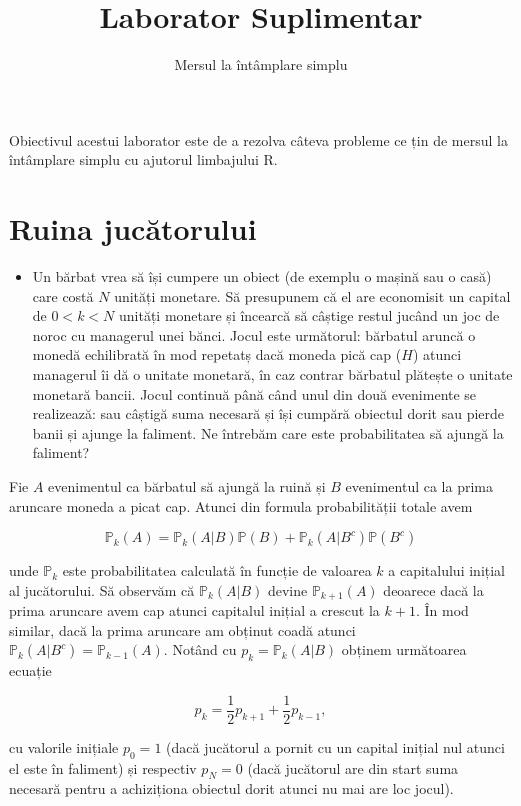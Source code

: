 \documentclass[]{article}
\title{Laborator Suplimentar}
\subtitle{Mersul la întâmplare simplu}
\author{}
\date{}
\newenvironment{frshaded*}{%
  \def\FrameCommand{\fboxrule=\FrameRule\fboxsep=\FrameSep \fcolorbox{framecolor}{shadecolor1}}%
  \MakeFramed {\advance\hsize-\width \FrameRestore}}%
{\endMakeFramed}
\newenvironment{rmdblock}[1]
  {\begin{frshaded*}
  \begin{itemize}
  \renewcommand{\labelitemi}{
    \raisebox{-.7\height}[0pt][0pt]{
      {\setkeys{Gin}{width=2em,keepaspectratio}\texttt{[image: images/icons/\#1]}}
    }
  }
  \item
  }
  {
  \end{itemize}
  \end{frshaded*}
  }
\newenvironment{rmdexercise}
  {\begin{rmdblock}{exercise}}
  {\end{rmdblock}}
\begin{document}
\maketitle

\thispagestyle{fancy}

Obiectivul acestui laborator este de a rezolva câteva probleme ce țin de
mersul la întâmplare simplu cu ajutorul limbajului R.

\section{Ruina jucătorului}\label{ruina-jucatorului}

\begin{rmdexercise}
Un bărbat vrea să își cumpere un obiect (de exemplu o mașină sau o casă)
care costă \(N\) unități monetare. Să presupunem că el are economisit un
capital de \(0<k<N\) unități monetare și încearcă să câștige restul
jucând un joc de noroc cu managerul unei bănci. Jocul este următorul:
bărbatul aruncă o monedă echilibrată în mod repetatș dacă moneda pică
cap (\(H\)) atunci managerul îi dă o unitate monetară, în caz contrar
bărbatul plătește o unitate monetară bancii. Jocul continuă până când
unul din două evenimente se realizează: sau câștigă suma necesară și își
cumpără obiectul dorit sau pierde banii și ajunge la faliment. Ne
întrebăm care este probabilitatea să ajungă la faliment?
\end{rmdexercise}

Fie \(A\) evenimentul ca bărbatul să ajungă la ruină și \(B\)
evenimentul ca la prima aruncare moneda a picat cap. Atunci din formula
probabilității totale avem

\[
  \mathbb{P}_k(A) = \mathbb{P}_k(A|B)\mathbb{P}(B)+\mathbb{P}_k(A|B^c)\mathbb{P}(B^c)
\]

unde \(\mathbb{P}_k\) este probabilitatea calculată în funcție de
valoarea \(k\) a capitalului inițial al jucătorului. Să observăm că
\(\mathbb{P}_k(A|B)\) devine \(\mathbb{P}_{k+1}(A)\) deoarece dacă la
prima aruncare avem cap atunci capitalul inițial a crescut la \(k+1\).
În mod similar, dacă la prima aruncare am obținut coadă atunci
\(\mathbb{P}_k(A|B^c) = \mathbb{P}_{k-1}(A)\). Notând cu
\(p_k = \mathbb{P}_k(A|B)\) obținem următoarea ecuație

\[
  p_k = \frac{1}{2}p_{k+1} + \frac{1}{2}p_{k-1},
\]

cu valorile inițiale \(p_0=1\) (dacă jucătorul a pornit cu un capital
inițial nul atunci el este în faliment) și respectiv \(p_N=0\) (dacă
jucătorul are din start suma necesară pentru a achiziționa obiectul
dorit atunci nu mai are loc jocul).
\end{document}
